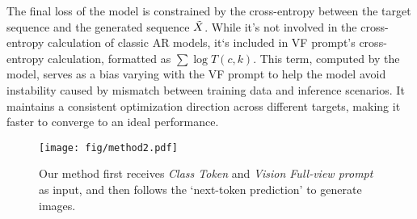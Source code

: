 The final loss of the model is constrained by the cross-entropy between the target sequence and the generated sequence $\Tilde{X}$. While it’s not involved in the cross-entropy calculation of classic AR models, it‘s included in VF prompt's cross-entropy calculation, formatted as $\sum \log T(c,k)$. This term, computed by the model, serves as a bias varying with the VF prompt to help the model avoid instability caused by mismatch between training data and inference scenarios. It maintains a consistent optimization direction across different targets, making it faster to converge to an ideal performance.




\begin{figure}[t]
  \centering

\texttt{[image: fig/method2.pdf]}
   \caption{Our method first receives \textit{Class Token} and \textit{Vision Full-view prompt} as input, and then follows the `next-token prediction' to generate images.
}
   \label{fig:architecture}
\end{figure}
